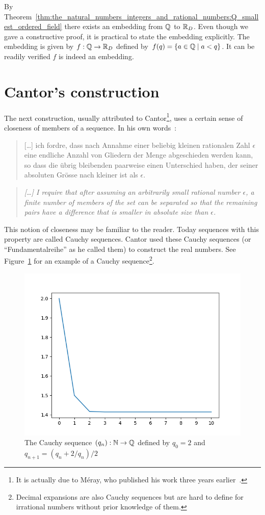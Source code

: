 \documentclass[../main.tex]{subfiles}
\begin{document}
By Theorem~\ref{thm:the_natural_numbers_integers_and_rational_numbers:Q_smallest_ordered_field} there exists an embedding from $\mathbb{Q}$ to $\mathbb{R}_D$. Even though we gave a constructive proof, it is practical to state the embedding explicitly. The embedding is given by $f:\mathbb{Q}\to\mathbb{R}_D$ defined by $f(q)=\{a\in\mathbb{Q}\mid a<q\}$. It can be readily verified $f$ is indeed an embedding.

\section{Cantor's construction}\label{sec:the_real_numbers:cantors_construction}
The next construction, usually attributed to Cantor\footnote{It is actually due to Méray, who published his work three years earlier~\cite{Meray1869}.}, uses a certain sense of closeness of members of a sequence. In his own words~\cite{Cantor1883}:
\begin{quote}
    \textgerman{[\dots] ich fordre, dass nach Annahme einer beliebig kleinen rationalen Zahl $\epsilon$ eine endliche Anzahl von Gliedern der Menge abgeschieden werden kann, so dass die übrig bleibenden paarweise einen Unterschied haben, der seiner absoluten Grösse nach kleiner ist als $\epsilon$.}
\end{quote}
\begin{quote}
    \textit{[\ldots] I require that after assuming an arbitrarily small rational number $\epsilon$, a finite number of members of the set can be separated so that the remaining pairs have a difference that is smaller in absolute size than $\epsilon$.}
\end{quote}
This notion of closeness may be familiar to the reader. Today sequences with this property are called Cauchy sequences. Cantor used these Cauchy sequences (or ``\textgerman{Fundamentalreihe}'' as he called them) to construct the real numbers. See Figure~\ref{fig:the_real_numbers:cauchy_sequence} for an example of a Cauchy sequence\footnote{Decimal expansions are also Cauchy sequences but are hard to define for irrational numbers without prior knowledge of them.}.
\begin{figure}[!htbp]
    \centering
    \includegraphics[width=0.75\linewidth]{figures/cauchy_sequence}
    \caption{The Cauchy sequence $(q_n):\mathbb{N}\to\mathbb{Q}$ defined by $q_0=2$ and $q_{n+1}=(q_n+2/q_n)/2$}
    \label{fig:the_real_numbers:cauchy_sequence}
\end{figure}
\end{document}
